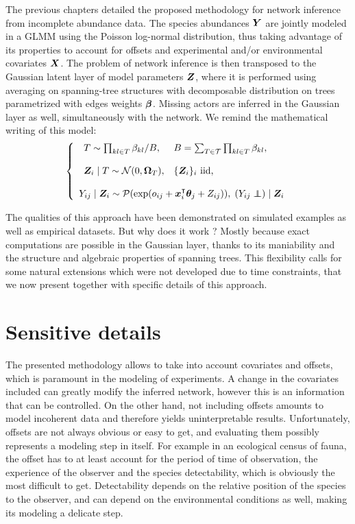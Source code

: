  
 The previous chapters detailed the proposed methodology for network inference from incomplete abundance data. The species abundances ${\boldsymbol{Y}}$ are jointly modeled in a GLMM using the Poisson log-normal distribution, thus taking advantage of its properties to account for offsets and experimental and/or environmental covariates ${\boldsymbol{X}}$. The problem of network inference is then transposed to the Gaussian latent layer of model parameters ${\boldsymbol{Z}}$, where it is performed using averaging on spanning-tree structures with decomposable distribution on trees parametrized with edges weights ${\boldsymbol{\beta}}$. Missing actors are inferred in the Gaussian layer as well, simultaneously with the network. We remind the mathematical writing of this model:
  \begin{equation*}
 \left\{ \begin{array}{l}
 \begin{array}{ll}
 T\sim \prod_{kl\in T} \beta_{kl} / B, &B= \sum_{T\in\mathcal{T}} \prod_{kl \in T} \beta_{kl},\\\\
 \Zbf_i\mid T  \sim \Ncal (0, \Omegab_T), &\{\Zbf_i\}_i \text{ iid, }\\
 \end{array} \\\\
 Y_{ij}\mid \Zbf_i\sim \Pcal (\exp (o_{ij}+\xb_i^\intercal \thetab_j + Z_{ij})), \; (Y_{ij} \independent) \mid \Zbf_i 
 \end{array} \right.
 \end{equation*}
 
 The qualities of this approach have been demonstrated on simulated examples as well as empirical datasets. But why does it work ? Mostly because exact computations are possible in the Gaussian layer, thanks to its maniability and the structure and algebraic properties of spanning trees.  This flexibility calls for some natural extensions which were not developed due to time constraints, that we now present together with specific details of this approach.
 
 
\section{Sensitive details}
The presented methodology allows to take into account covariates and offsets, which is paramount in the modeling of experiments. A change in the covariates included can greatly modify the inferred network, however this is an information that can be controlled. On the other hand, not including offsets amounts to model incoherent data and therefore yields uninterpretable results. Unfortunately, offsets are not always obvious or easy to get, and evaluating them possibly represents a modeling step in itself. For example in an ecological census of fauna, the offset has to at least account for the period of time of observation, the experience of the observer and the species detectability, which is obviously the most difficult to get. Detectability depends on the relative position of the species to the observer, and can depend on the environmental conditions as well, making its modeling a delicate step.\\

